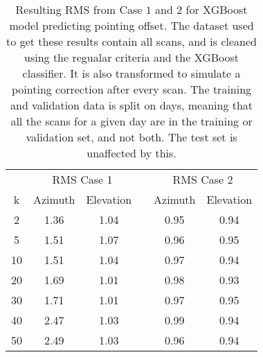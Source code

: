 \begin{table}[h]
    \centering %
    \caption{Resulting RMS from Case $1$ and $2$ for XGBoost model predicting pointing offset.
    The dataset used to get these results contain all scans, and is cleaned using the regualar criteria and the XGBoost classifier.
    It is also transformed to simulate a pointing correction after every scan.
    The training and validation data is split on days, meaning that all the scans for a given day
    are in the training or validation set, and not both. The test set is unaffected by this.}
    \begin{tabular}{ccc c cc}
        \toprule
        \multicolumn{1}{c}{} & \multicolumn{2}{c}{RMS Case 1} & & \multicolumn{2}{c}{RMS Case 2} \\
        \cmidrule(lr){2-3} \cmidrule(lr){5-6}
         k & Azimuth & Elevation & & Azimuth & Elevation \\
        \midrule
         2 &  1.36 & 1.04 & & 0.95 &  0.94 \\
         5 &  1.51 & 1.07 & & 0.96 &  0.95 \\
        10 &  1.51 & 1.04 & & 0.97 &  0.94 \\
        20 &  1.69 & 1.01 & & 0.98 &  0.93 \\
        30 &  1.71 & 1.01 & & 0.97 &  0.95 \\
        40 &  2.47 & 1.03 & & 0.99 &  0.94 \\
        50 &  2.49 & 1.03 & & 0.96 &  0.94 \\
        \bottomrule
    \end{tabular}        
\end{table}